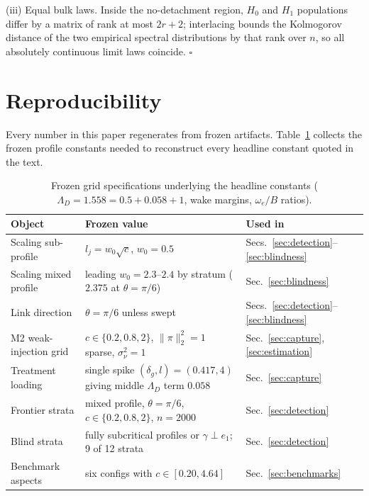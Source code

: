 \documentclass[11pt]{article}
\theoremstyle{definition}
\theoremstyle{remark}
\begin{document}
\noindent(iii) Equal bulk laws. Inside the no-detachment region, $H_0$ and $H_1$ populations differ by a matrix of rank at most $2r+2$; interlacing bounds the Kolmogorov distance of the two empirical spectral distributions by that rank over $n$, so all absolutely continuous limit laws coincide. \hfill$\square$



\section{Reproducibility}\label{app:repro}

Every number in this paper regenerates from frozen artifacts. Table~\ref{tab:gridspec} collects the frozen profile constants needed to reconstruct every headline constant quoted in the text.

\begin{table}[h]
\centering\small
\begin{tabular}{lll}
\toprule
Object & Frozen value & Used in \\
\midrule
Scaling sub-profile & $l_j=w_0\sqrt c$, $w_0=0.5$ & Secs.~\ref{sec:detection}--\ref{sec:blindness} \\
Scaling mixed profile & leading $w_0=2.3$--$2.4$ by stratum ($2.375$ at $\theta=\pi/6$) & Sec.~\ref{sec:blindness} \\
Link direction & $\theta=\pi/6$ unless swept & Secs.~\ref{sec:detection}--\ref{sec:blindness} \\
M2 weak-injection grid & $c\in\{0.2,0.8,2\}$, $\|\pi\|_2^2=1$ sparse, $\sigma_\nu^2=1$ & Sec.~\ref{sec:capture}, \ref{sec:estimation} \\
Treatment loading & single spike $(\delta_g,l)=(0.417,4)$ giving middle $\Lambda_D$ term $0.058$ & Sec.~\ref{sec:capture} \\
Frontier strata & mixed profile, $\theta=\pi/6$, $c\in\{0.2,0.8,2\}$, $n=2000$ & Sec.~\ref{sec:detection} \\
Blind strata & fully subcritical profiles or $\gamma\perp e_1$; 9 of 12 strata & Sec.~\ref{sec:detection} \\
Benchmark aspects & six configs with $c\in[0.20,4.64]$ & Sec.~\ref{sec:benchmarks} \\
\bottomrule
\end{tabular}
\caption{Frozen grid specifications underlying the headline constants ($\Lambda_D=1.558=0.5+0.058+1$, wake margins, $\omega_e/B$ ratios).}
\label{tab:gridspec}
\end{table}
\end{document}
